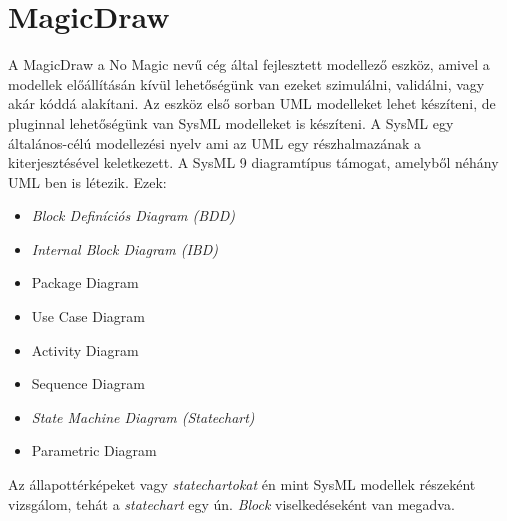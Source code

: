 \section{MagicDraw}
A MagicDraw a No Magic nevű cég által fejlesztett modellező eszköz, amivel a modellek előállításán kívül lehetőségünk van ezeket szimulálni, validálni, vagy akár kóddá alakítani. Az eszköz első sorban UML modelleket lehet készíteni, de pluginnal lehetőségünk van SysML modelleket is készíteni. A SysML egy általános-célú modellezési nyelv ami az UML egy részhalmazának a kiterjesztésével keletkezett. A SysML 9 diagramtípus támogat, amelyből néhány UML ben is létezik. Ezek:
\begin{itemize}
	\item \emph{Block Definíciós Diagram (BDD)}
	\item \emph{Internal Block Diagram (IBD)}
	\item Package Diagram
	\item Use Case Diagram
	\item Activity Diagram
	\item Sequence Diagram
	\item \emph{State Machine Diagram (Statechart)}
	\item Parametric Diagram
\end{itemize}
Az állapottérképeket vagy \emph{statechartokat} én mint SysML modellek részeként vizsgálom, tehát a \emph{statechart} egy ún. \emph{Block} viselkedéseként van megadva.
